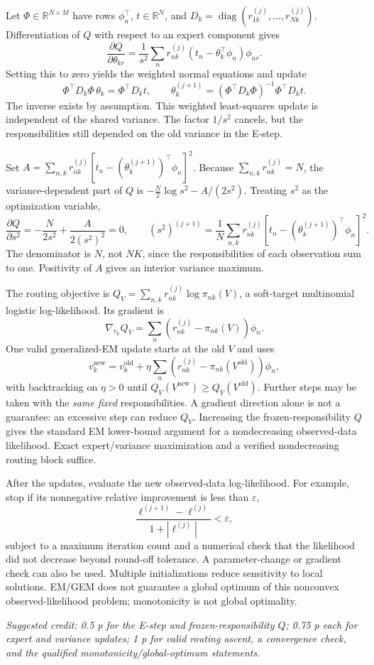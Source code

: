 \documentclass[11pt,a4paper]{article}
\newcommand{\R}{\mathbb R}
\newcommand{\selfcredit}[1]{\par\textit{Suggested credit: #1}\par}
\begin{document}
Let $\Phi\in\R^{N\times M}$ have rows $\phi_n^\top$,
$t\in\R^N$, and $D_k=\operatorname{diag}(r_{1k}^{(j)},\ldots,r_{Nk}^{(j)})$.
Differentiation of $Q$ with respect to an expert component gives
\[
\frac{\partial Q}{\partial\theta_{kr}}
=\frac1{s^2}\sum_nr_{nk}^{(j)}(t_n-\theta_k^\top\phi_n)\phi_{nr}.
\]
Setting this to zero yields the weighted normal equations and update
\[
\Phi^\top D_k\Phi\,\theta_k=\Phi^\top D_kt,
\qquad
\boxed{\theta_k^{(j+1)}=(\Phi^\top D_k\Phi)^{-1}\Phi^\top D_kt}.
\]
The inverse exists by assumption. This weighted least-squares update is
independent of the shared variance. The factor $1/s^2$ cancels, but the
responsibilities still depended on the old variance in the E-step.

Set
$A=\sum_{n,k}r_{nk}^{(j)}[t_n-(\theta_k^{(j+1)})^\top\phi_n]^2$.
Because $\sum_{n,k}r_{nk}^{(j)}=N$, the variance-dependent part of $Q$ is
$-\tfrac N2\log s^2-A/(2s^2)$. Treating $s^2$ as the optimization variable,
\[
\frac{\partial Q}{\partial s^2}=-\frac N{2s^2}+\frac A{2(s^2)^2}=0,
\qquad
\boxed{(s^2)^{(j+1)}=\frac1N\sum_{n,k}r_{nk}^{(j)}
[t_n-(\theta_k^{(j+1)})^\top\phi_n]^2}.
\]
The denominator is $N$, not $NK$, since the responsibilities of each
observation sum to one. Positivity of $A$ gives an interior variance maximum.

The routing objective is
$Q_V=\sum_{n,k}r_{nk}^{(j)}\log\pi_{nk}(V)$, a soft-target multinomial
logistic log-likelihood. Its gradient is
\[
\nabla_{v_k}Q_V=\sum_n(r_{nk}^{(j)}-\pi_{nk}(V))\phi_n.
\]
One valid generalized-EM update starts at the old $V$ and uses
\[
v_k^{\mathrm{new}}=v_k^{\mathrm{old}}
+\eta\sum_n(r_{nk}^{(j)}-\pi_{nk}(V^{\mathrm{old}}))\phi_n,
\]
with backtracking on $\eta>0$ until $Q_V(V^{\mathrm{new}})\geq Q_V(V^{\mathrm{old}})$.
Further steps may be taken with the \emph{same fixed} responsibilities.
A gradient direction alone is not a guarantee: an excessive step can reduce
$Q_V$. Increasing the frozen-responsibility $Q$ gives the standard EM lower-bound
argument for a nondecreasing observed-data likelihood. Exact expert/variance
maximization and a verified nondecreasing routing block suffice.

After the updates, evaluate the new observed-data log-likelihood. For example,
stop if its nonnegative relative improvement is less than $\varepsilon$,
\[
\frac{\ell^{(j+1)}-\ell^{(j)}}{1+|\ell^{(j)}|}<\varepsilon,
\]
subject to a maximum iteration count and a numerical check that the likelihood
did not decrease beyond round-off tolerance. A parameter-change or gradient
check can also be used. Multiple initializations reduce sensitivity to local
solutions. EM/GEM does not guarantee a global optimum of this nonconvex
observed-likelihood problem; monotonicity is not global optimality.
\selfcredit{0.5 p for the E-step and frozen-responsibility $Q$; 0.75 p each for expert and variance updates; 1 p for valid routing ascent, a convergence check, and the qualified monotonicity/global-optimum statements.}
\end{document}
